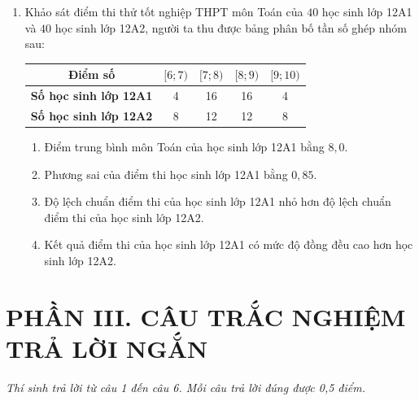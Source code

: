 \documentclass[12pt,a4paper]{article}
\begin{document}
\begin{enumerate}[label=\textbf{Câu \arabic*:}, leftmargin=*]
\item Khảo sát điểm thi thử tốt nghiệp THPT môn Toán của $40$ học sinh lớp 12A1 và $40$ học sinh lớp 12A2, người ta thu được bảng phân bố tần số ghép nhóm sau:
\begin{center}
\begin{tabular}{|c|c|c|c|c|}
\hline
\textbf{Điểm số} & $[6; 7)$ & $[7; 8)$ & $[8; 9)$ & $[9; 10)$ \\ \hline
\textbf{Số học sinh lớp 12A1} & 4 & 16 & 16 & 4 \\ \hline
\textbf{Số học sinh lớp 12A2} & 8 & 12 & 12 & 8 \\ \hline
\end{tabular}
\end{center}
\begin{enumerate}[label=\textbf{\alph*)}]
    \item Điểm trung bình môn Toán của học sinh lớp 12A1 bằng $8{,}0$.
    \item Phương sai của điểm thi học sinh lớp 12A1 bằng $0{,}85$.
    \item Độ lệch chuẩn điểm thi của học sinh lớp 12A1 nhỏ hơn độ lệch chuẩn điểm thi của học sinh lớp 12A2.
    \item Kết quả điểm thi của học sinh lớp 12A1 có mức độ đồng đều cao hơn học sinh lớp 12A2.
\end{enumerate}

\end{enumerate}

\vspace{0.4cm}
\section*{\large PHẦN III. CÂU TRẮC NGHIỆM TRẢ LỜI NGẮN}
\textit{Thí sinh trả lời từ câu 1 đến câu 6. Mỗi câu trả lời đúng được 0,5 điểm.}
\end{document}

